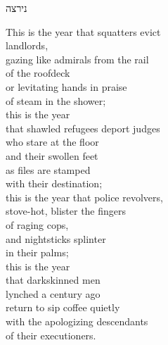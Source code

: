 \documentclass[a4paper,12pt,openany]{memoir}
\newcommand{\hchapter}[1]{
  \begin{hebrew}
    \begin{Spacing}{.97}
      \newpage
      \strut

      \vspace{.15em}

      \noindent\Huge #1

      \vspace{1em}
    \end{Spacing}
  \end{hebrew}
}
\begin{document}
\vfill

\hchapter{נירצה}

\begin{multicols}{2}
\noindent
\small
This is the year that squatters evict \\
\vin landlords, \\
gazing like admirals from the rail \\
of the roofdeck \\
or levitating hands in praise \\
of steam in the shower; \\
this is the year \\
that shawled refugees deport judges \\
who stare at the floor \\
and their swollen feet \\
as files are stamped \\
with their destination; \\
this is the year that police revolvers, \\
stove-hot, blister the fingers \\
of raging cops, \\
and nightsticks splinter \\
in their palms; \\
this is the year \\
that darkskinned men \\
lynched a century ago \\
return to sip coffee quietly \\
with the apologizing descendants \\
of their executioners. \\
 

\end{multicols}
\end{document}
